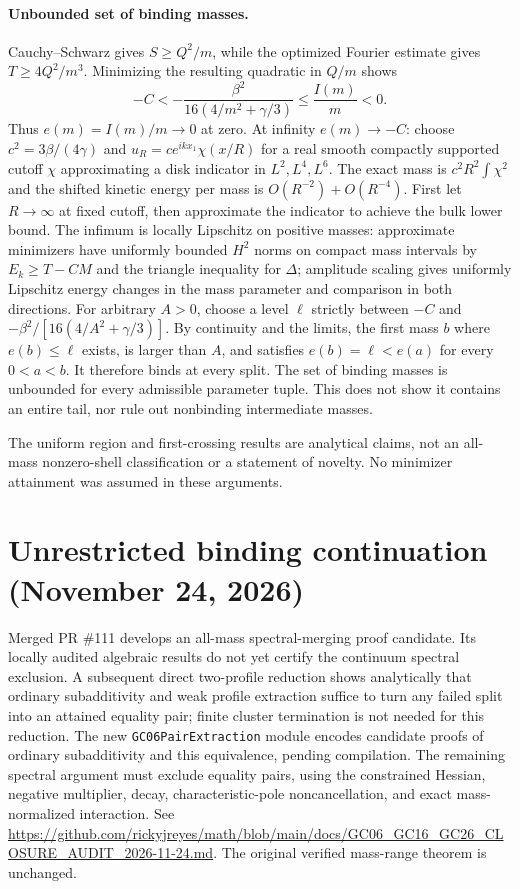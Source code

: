 \documentclass[11pt,letterpaper]{article}
\numberwithin{equation}{section}
\begin{document}
\paragraph{Unbounded set of binding masses.}
Cauchy--Schwarz gives $S\ge Q^2/m$, while the optimized Fourier estimate
gives $T\ge4Q^2/m^3$. Minimizing the resulting quadratic in $Q/m$ shows
\[
 -C<-\frac{\beta^2}{16(4/m^2+\gamma/3)}\le \frac{I(m)}m<0.
\]
Thus $e(m)=I(m)/m\to0$ at zero. At infinity $e(m)\to-C$:
choose $c^2=3\beta/(4\gamma)$ and $u_R=c e^{ikx_1}\chi(x/R)$ for a
real smooth compactly supported cutoff $\chi$ approximating a disk
indicator in $L^2,L^4,L^6$. The exact mass is $c^2R^2\int\chi^2$ and
the shifted kinetic energy per mass is $O(R^{-2})+O(R^{-4})$.
First let $R\to\infty$ at fixed cutoff, then approximate the indicator
to achieve the bulk lower bound. The infimum is locally Lipschitz on
positive masses: approximate minimizers have uniformly bounded $H^2$
norms on compact mass intervals by $E_k\ge T-CM$ and the triangle
inequality for $\Delta$; amplitude scaling gives uniformly Lipschitz
energy changes in the mass parameter and comparison in both directions.
For arbitrary $A>0$, choose a level $\ell$ strictly between $-C$ and
$-\beta^2/[16(4/A^2+\gamma/3)]$. By continuity and the limits, the first
mass $b$ where $e(b)\le\ell$ exists, is larger than $A$, and satisfies
$e(b)=\ell<e(a)$ for every $0<a<b$. It therefore binds at every split.
The set of binding masses is unbounded for every admissible parameter
tuple. This does not show it contains an entire tail, nor rule out
nonbinding intermediate masses.

The uniform region and first-crossing results are analytical claims,
not an all-mass nonzero-shell classification or a statement of novelty.
No minimizer attainment was assumed in these arguments.


\section*{Unrestricted binding continuation (November 24, 2026)}
Merged PR \#111 develops an all-mass spectral-merging proof candidate.
Its locally audited algebraic results do not yet certify the continuum
spectral exclusion. A subsequent direct two-profile reduction shows
analytically that ordinary subadditivity and weak profile extraction
suffice to turn any failed split into an attained equality pair; finite
cluster termination is not needed for this reduction. The new
\texttt{GC06PairExtraction} module encodes candidate proofs of ordinary
subadditivity and this equivalence, pending compilation. The remaining
spectral argument must exclude equality pairs, using the constrained
Hessian, negative multiplier, decay, characteristic-pole noncancellation,
and exact mass-normalized interaction. See
\url{https://github.com/rickyjreyes/math/blob/main/docs/GC06_GC16_GC26_CLOSURE_AUDIT_2026-11-24.md}.
The original verified mass-range theorem is unchanged.
\end{document}
